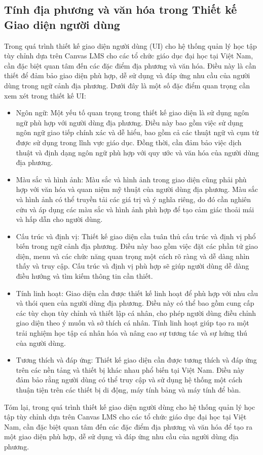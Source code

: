 \documentclass[../Thesis.tex]{subfiles}
\begin{document}
	\subsection{Tính địa phương và văn hóa trong Thiết kế Giao diện người dùng}
	Trong quá trình thiết kế giao diện người dùng (UI) cho hệ thống quản lý học tập tùy chỉnh dựa trên Canvas LMS cho các tổ chức giáo dục đại học tại Việt Nam, cần đặc biệt quan tâm đến các đặc điểm địa phương và văn hóa. Điều này là cần thiết để đảm bảo giao diện phù hợp, dễ sử dụng và đáp ứng nhu cầu của người dùng trong ngữ cảnh địa phương. Dưới đây là một số đặc điểm quan trọng cần xem xét trong thiết kế UI:

		\begin{itemize}
			\item Ngôn ngữ: Một yếu tố quan trọng trong thiết kế giao diện là sử dụng ngôn ngữ phù hợp với người dùng địa phương. Điều này bao gồm việc sử dụng ngôn ngữ giao tiếp chính xác và dễ hiểu, bao gồm cả các thuật ngữ và cụm từ được sử dụng trong lĩnh vực giáo dục. Đồng thời, cần đảm bảo việc dịch thuật và định dạng ngôn ngữ phù hợp với quy ước và văn hóa của người dùng địa phương.

			\item Màu sắc và hình ảnh: Màu sắc và hình ảnh trong giao diện cũng phải phù hợp với văn hóa và quan niệm mỹ thuật của người dùng địa phương. Màu sắc và hình ảnh có thể truyền tải các giá trị và ý nghĩa riêng, do đó cần nghiên cứu và áp dụng các màu sắc và hình ảnh phù hợp để tạo cảm giác thoải mái và hấp dẫn cho người dùng.

			\item Cấu trúc và định vị: Thiết kế giao diện cần tuân thủ cấu trúc và định vị phổ biến trong ngữ cảnh địa phương. Điều này bao gồm việc đặt các phần tử giao diện, menu và các chức năng quan trọng một cách rõ ràng và dễ dàng nhìn thấy và truy cập. Cấu trúc và định vị phù hợp sẽ giúp người dùng dễ dàng điều hướng và tìm kiếm thông tin cần thiết.

			\item Tính linh hoạt: Giao diện cần được thiết kế linh hoạt để phù hợp với nhu cầu và thói quen của người dùng địa phương. Điều này có thể bao gồm cung cấp các tùy chọn tùy chỉnh và thiết lập cá nhân, cho phép người dùng điều chỉnh giao diện theo ý muốn và sở thích cá nhân. Tính linh hoạt giúp tạo ra một trải nghiệm học tập cá nhân hóa và nâng cao sự tương tác và sự hứng thú của người dùng.

			\item Tương thích và đáp ứng: Thiết kế giao diện cần được tương thích và đáp ứng trên các nền tảng và thiết bị khác nhau phổ biến tại Việt Nam. Điều này đảm bảo rằng người dùng có thể truy cập và sử dụng hệ thống một cách thuận tiện trên các thiết bị di động, máy tính bảng và máy tính để bàn.
		\end{itemize}
		Tóm lại, trong quá trình thiết kế giao diện người dùng cho hệ thống quản lý học tập tùy chỉnh dựa trên Canvas LMS cho các tổ chức giáo dục đại học tại Việt Nam, cần đặc biệt quan tâm đến các đặc điểm địa phương và văn hóa để tạo ra một giao diện phù hợp, dễ sử dụng và đáp ứng nhu cầu của người dùng địa phương.
\end{document}
